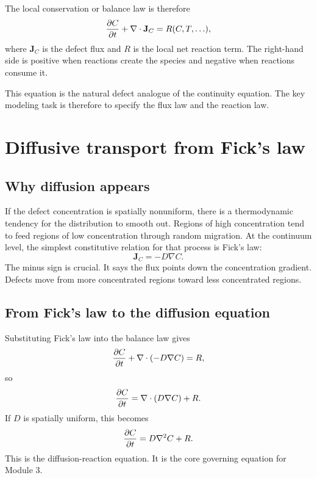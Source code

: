 \documentclass[11pt]{article}
\begin{document}
The local conservation or balance law is therefore
\begin{equation}
\pdv{C}{t} + \nabla \cdot \mathbf{J}_C = R(C,T,\ldots),
\end{equation}
where $\mathbf{J}_C$ is the defect flux and $R$ is the local net reaction term. The right-hand side is positive when reactions create the species and negative when reactions consume it.

This equation is the natural defect analogue of the continuity equation. The key modeling task is therefore to specify the flux law and the reaction law.

\section{Diffusive transport from Fick's law}

\subsection{Why diffusion appears}

If the defect concentration is spatially nonuniform, there is a thermodynamic tendency for the distribution to smooth out. Regions of high concentration tend to feed regions of low concentration through random migration. At the continuum level, the simplest constitutive relation for that process is Fick's law:
\begin{equation}
\mathbf{J}_C = -D \nabla C.
\end{equation}
The minus sign is crucial. It says the flux points down the concentration gradient. Defects move from more concentrated regions toward less concentrated regions.

\subsection{From Fick's law to the diffusion equation}

Substituting Fick's law into the balance law gives
\begin{equation}
\pdv{C}{t} + \nabla \cdot (-D \nabla C) = R,
\end{equation}
so
\begin{equation}
\pdv{C}{t} = \nabla \cdot (D \nabla C) + R.
\end{equation}
If $D$ is spatially uniform, this becomes
\begin{equation}
\pdv{C}{t} = D \nabla^2 C + R.
\end{equation}
This is the diffusion-reaction equation. It is the core governing equation for Module 3.
\end{document}
